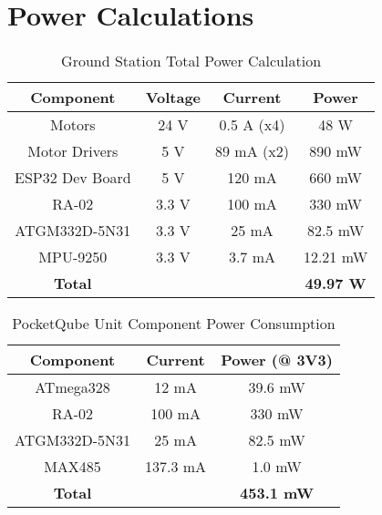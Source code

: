 \section{Power Calculations}
\begin{table}[!htb]
  \centering
  \renewcommand{\arraystretch}{1.2}
  \begin{tabular}{ |c|c|c|c| }
  \hline
  \textbf{Component}        & \textbf{Voltage}    & \textbf{Current}     & \textbf{Power}   \\
  \hline
  Motors                    & 24 V                & 0.5 A (x4)           & 48 W             \\ \hline
  Motor Drivers             & 5 V                 & 89 mA (x2)           & 890 mW           \\ \hline
  ESP32 Dev Board           & 5 V                 & 120 mA               & 660 mW           \\ \hline
  RA-02                     & 3.3 V               & 100 mA               & 330 mW           \\ \hline
  ATGM332D-5N31             & 3.3 V               & 25 mA                & 82.5 mW          \\ \hline
  MPU-9250                  & 3.3 V               & 3.7 mA               & 12.21 mW         \\ \hline
  \textbf{Total}            &                     &                      & \textbf{49.97 W}         \\ \hline
  \end{tabular}
  \caption{Ground Station Total Power Calculation}
  \label{tab:gs_component_consumption}
\end{table}

\begin{table}[!htb]
  \centering
  \renewcommand{\arraystretch}{1.2}
  \begin{tabular}{ |c|c|c| }
  \hline
  \textbf{Component}        & \textbf{Current}        & \textbf{Power (@ 3V3)}      \\ \hline 
  ATmega328                 & 12 mA                   & 39.6 mW                     \\ \hline 
  RA-02                     & 100 mA                  & 330 mW                      \\ \hline 
  ATGM332D-5N31             & 25 mA                   & 82.5 mW                     \\ \hline
  MAX485                    & 137.3 mA                & 1.0 mW                        \\ \hline
  \textbf{Total}            &                         & \textbf{453.1 mW}         \\ \hline
  \end{tabular}
  \caption{PocketQube Unit Component Power Consumption}
  \label{tab:pqunit_component_consumption}
\end{table}


